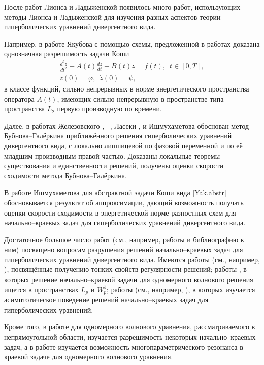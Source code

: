 \documentclass{report}
\begin{document}
После работ Лионса и Ладыженской появилось много работ, использующих методы Лионса и Ладыженской для изучения разных аспектов теории гиперболических уравнений дивергентного вида.

Например, в работе Якубова \cite{Yakubov} с помощью схемы, предложенной в работах \cite{Lad1954,Lad1956,Lad1958} доказана однозначная разрешимость задачи Коши
\begin{gather}\label{Yak.abstr}
\frac{d^2z}{dt^2}+A(t)\frac{dz}{dt}+B(t)z=f(t),\,\,\,t\in[0,T],\\
z(0)=\varphi,\,\,\,\dot{z}(0)=\psi,
\end{gather}
в классе функций, сильно непрерывных в норме энергетического пространства оператора $A(t)$, имеющих сильно непрерывную в пространстве типа пространства $L_2$ первую производную по времени.

Далее, в работах Железовского \cite{ZhelBuk2}, \cite{Zhel1995}--\cite{ZhelLyashko}, Ласеки \cite{LasiekaSokolowski,BalesLasiecka}, и Ишмухаметова обоснован метод
Бубнова--Галёркина приближённого решения гиперболических уравнений дивергентного вида, с локально липшицевой по фазовой переменной и по её младшим производным правой частью. Доказаны
локальные теоремы существования и единственности решений, получены оценки скорости сходимости метода Бубнова--Галёркина.

В работе Ишмухаметова \cite{Ishmuhametov} для абстрактной задачи Коши вида \eqref{Yak.abstr} обосновывается результат об аппроксимации, дающий возможность получать оценки скорости
сходимости в энергетической норме разностных схем для начально--краевых задач для гиперболических уравнений дивергентного вида.

Достаточное большое число работ (см., например, работы \cite{Del'Santo.Mitidieri,Pohozhaev.Mitidieri} и библиографию к ним) посвящено вопросам разрушения решений начально--краевых задач
для гиперболических уравнений дивергентного вида. Имеются работы (см., например, \cite{LasiekaLionsTriggiani,LasiekaTriggiani1,LasiekaTriggiani2}), посвящённые получению тонких свойств
регулярности решений; работы \cite{Il'inKuleshov2012a,Il'inKuleshov2012a,Nikitin}, в которых решение начально--краевой задачи для одномерного волнового решения ищется в пространствах $L_p$
и $W^1_p$; работы (см., например, \cite{Ramm,KaraStavr}), в которых изучается асимптотическое поведение решений начально--краевых задач для гиперболических уравнений.

Кроме того, в работе \cite{KozhanovLar'kin} для одномерного волнового уравнения, рассматриваемого в непрямоугольной области, изучается разрешимость некоторых начально--краевых задач,
а в работе \cite{KolesovRozov} изучается возможность многопараметрического резонанса в  краевой задаче для одномерного волнового уравнения.
\end{document}
